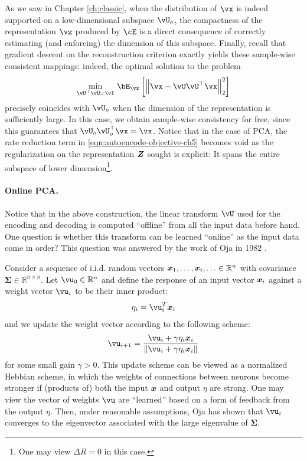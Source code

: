 \documentclass[../../book-main.tex]{subfiles}
\begin{document}
As we saw in Chapter \ref{ch:classic}, when the distribution of $\vx$ is indeed
supported on a low-dimensional subspace $\vU_o$, the compactness of
the representation
$\vz$ produced by $\cE$ is a direct consequence of correctly
estimating (and enforcing) the dimension of this subspace.  Finally,
recall that gradient descent on the reconstruction criterion exactly
yields these sample-wise consistent mappings: indeed, the optimal
solution to the problem
\begin{equation}\label{eq:pca-reconstruction-ch5}
  \min_{\vU^\top \vU = \vI}\, \bE_{\vx}\left[\norm*{\vx
  - \vU\vU^\top \vx}_2^2\right]
\end{equation}
precisely coincides with $\vU_o$ when the dimension of the representation is
sufficiently large. In this case, we obtain sample-wise consistency
for free, since this guarantees that $\vU_o\vU_o^\top \vx = \vx$.
Notice that in the case of PCA, the rate reduction term in
\eqref{eqn:autoencode-objective-ch5} becomes void as the regularization
on the representation $\bm{Z}$ sought is explicit: It spans the entire
subspace of lower dimension\footnote{One may view $\Delta R = 0$ in this case.}.

\paragraph{Online PCA.} Notice that in the above construction, the
linear transform $\vU$
used for the encoding and decoding is computed ``offline'' from all
the input data before hand. One question is whether this transform
can be learned ``online'' as the input data come in order? This
question was answered by the work of Oja in 1982 \cite{Oja1982SimplifiedNM}.
\begin{example} Consider a
  sequence of i.i.d. random vectors $\bm{x}_1, \ldots, \bm{x}_i, \ldots \in
  \mathbb{R}^n$ with covariance $\boldsymbol{\Sigma} \in
  \mathbb{R}^{n\times n}$. Let $\vu_0 \in \mathbb{R}^n$ and define
  the response of an input vector $\bm{x}_i$ against a weight vector
  $\vu_i$ to be their inner product:
  \begin{equation}
    \eta_i = \vu_i^T \x_i
  \end{equation}
  and we update the weight vector according to the following scheme:
  \begin{equation}
    \vu_{i+1} = \frac{\vu_i + \gamma \eta_i \x_i}{\|\vu_i + \gamma
    \eta_i \x_i\|}
    \label{eqn:Hebbian}
  \end{equation}
  for some small gain $\gamma >0$. This update scheme can be viewed
  as a normalized Hebbian scheme, in which the weights of connections
  between neurons become stronger if (products of) both the input
  $\bm{x}$ and output $\eta$ are strong. One may view the vector of
  weights $\vu$ are ``learned'' based on a form of feedback from the
  output $\eta$.
  Then, under reasonable assumptions, Oja \cite{Oja1982SimplifiedNM} has 
  shown that $\vu_i$ converges to the eigenvector associated with
  the large eigenvalue of $\boldsymbol{\Sigma}$.
\end{example}
\end{document}
